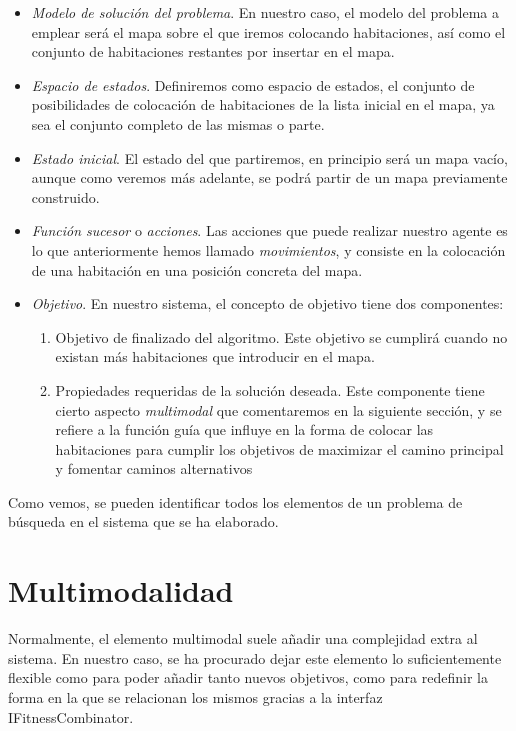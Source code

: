 \begin{itemize}
	\item \emph{Modelo de solución del problema}. En nuestro caso, el modelo del problema a emplear será el mapa sobre el que iremos colocando habitaciones, así como el conjunto de habitaciones restantes por insertar en el mapa.
	\item \emph{Espacio de estados}. Definiremos como espacio de estados, el conjunto de posibilidades de colocación de habitaciones de la lista inicial en el mapa, ya sea el conjunto completo de las mismas o parte.
	\item \emph{Estado inicial}. El estado del que partiremos, en principio será un mapa vacío, aunque como veremos más adelante, se podrá partir de un mapa previamente construido.
	\item \emph{Función sucesor} o \emph{acciones}. Las acciones que puede realizar nuestro agente es lo que anteriormente hemos llamado \emph{movimientos}, y consiste en la colocación de una habitación en una posición concreta del mapa.
	\item \emph{Objetivo}. En nuestro sistema, el concepto de objetivo tiene dos componentes:
		\begin{enumerate}
			\item Objetivo de finalizado del algoritmo. Este objetivo se cumplirá cuando no existan más habitaciones que introducir en el mapa.
			\item Propiedades requeridas de la solución deseada. Este componente tiene cierto aspecto \emph{multimodal} que comentaremos en la siguiente sección, y se refiere a la función guía que influye en la forma de colocar las habitaciones para cumplir los objetivos de maximizar el camino principal y fomentar caminos alternativos
		\end{enumerate}
\end{itemize}

Como vemos, se pueden identificar todos los elementos de un problema de búsqueda en el sistema que se ha elaborado.


\section{Multimodalidad}

Normalmente, el elemento multimodal suele añadir una complejidad extra al sistema. En nuestro caso, se ha procurado dejar este elemento lo suficientemente flexible como para poder añadir tanto nuevos objetivos, como para redefinir la forma en la que se relacionan los mismos gracias a la interfaz IFitnessCombinator.

